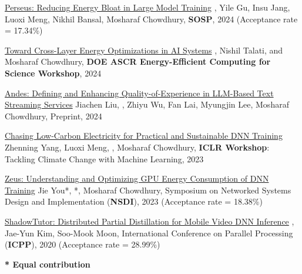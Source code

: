 

\begin{cvlist}

  \cvlistitem
    {\href{https://arxiv.org/abs/2312.06902}{Perseus: Reducing Energy Bloat in Large Model Training}} %
    {, Yile Gu, Insu Jang, Luoxi Meng, Nikhil Bansal, Mosharaf Chowdhury, \textbf{SOSP}, 2024 (Acceptance rate = 17.34\%)} %

  \cvlistitem
    {\href{https://arxiv.org/abs/2404.06675}{Toward Cross-Layer Energy Optimizations in AI Systems}} %
    {, Nishil Talati, and Mosharaf Chowdhury, \textbf{DOE ASCR Energy-Efficient Computing for Science Workshop}, 2024} %

  \cvlistitem
    {\href{https://arxiv.org/abs/2404.16283}{Andes: Defining and Enhancing Quality-of-Experience in LLM-Based Text Streaming Services}} %
    {Jiachen Liu, , Zhiyu Wu, Fan Lai, Myungjin Lee, Mosharaf Chowdhury, Preprint, 2024} %

  \cvlistitem
    {\href{https://www.climatechange.ai/papers/iclr2023/29}{Chasing Low-Carbon Electricity for Practical and Sustainable DNN Training}} %
    {Zhenning Yang, Luoxi Meng, , Mosharaf Chowdhury, \textbf{ICLR Workshop}: Tackling Climate Change with Machine Learning, 2023} %

  \cvlistitem
    {\href{https://www.usenix.org/conference/nsdi23/presentation/you}{Zeus: Understanding and Optimizing GPU Energy Consumption of DNN Training}} %
    {Jie You*, *, Mosharaf Chowdhury, Symposium on Networked Systems Design and Implementation (\textbf{NSDI}), 2023 (Acceptance rate = 18.38\%)} %

  \cvlistitem
    {\href{https://dl.acm.org/doi/10.1145/3404397.3404404}{ShadowTutor: Distributed Partial Distillation for Mobile Video DNN Inference}} %
    {, Jae-Yun Kim, Soo-Mook Moon, International Conference on Parallel Processing (\textbf{ICPP}), 2020 (Acceptance rate = 28.99\%)} %

\end{cvlist}

\vspace{-5mm}
\begin{cvparagraph}
  \textbf{* Equal contribution}
\end{cvparagraph}
